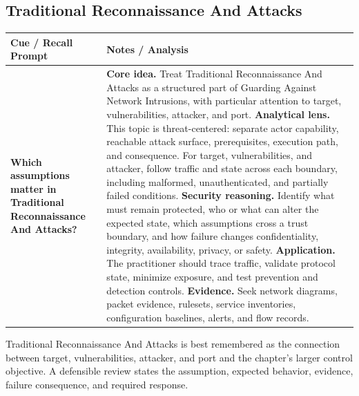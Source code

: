 \documentclass[11pt]{article}
\newcommand{\CornellHeader}{%
\rowcolor{Navy}\color{white}\bfseries Cue / Recall Prompt & \color{white}\bfseries Notes / Analysis\\\hline}
\newcommand{\CornellRow}[2]{%
\cellcolor{CueGray}\RaggedRight\textbf{#1} & \RaggedRight #2\\\hline}
\begin{document}
\subsection*{Traditional Reconnaissance And Attacks}
\begin{longtable}{>{\RaggedRight\arraybackslash}p{}|>{\RaggedRight\arraybackslash}p{}}
\CornellHeader
\CornellRow{Which assumptions matter in Traditional Reconnaissance And Attacks?}{\textbf{Core idea.} Treat Traditional Reconnaissance And Attacks as a structured part of Guarding Against Network Intrusions, with particular attention to target, vulnerabilities, attacker, and port. \textbf{Analytical lens.} This topic is threat-centered: separate actor capability, reachable attack surface, prerequisites, execution path, and consequence. For target, vulnerabilities, and attacker, follow traffic and state across each boundary, including malformed, unauthenticated, and partially failed conditions. \textbf{Security reasoning.} Identify what must remain protected, who or what can alter the expected state, which assumptions cross a trust boundary, and how failure changes confidentiality, integrity, availability, privacy, or safety. \textbf{Application.} The practitioner should trace traffic, validate protocol state, minimize exposure, and test prevention and detection controls. \textbf{Evidence.} Seek network diagrams, packet evidence, rulesets, service inventories, configuration baselines, alerts, and flow records.}
\end{longtable}
\begin{topicsummary}
Traditional Reconnaissance And Attacks is best remembered as the connection between target, vulnerabilities, attacker, and port and the chapter's larger control objective. A defensible review states the assumption, expected behavior, evidence, failure consequence, and required response.
\end{topicsummary}
\end{document}
